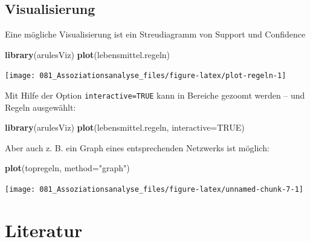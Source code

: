 \documentclass[12pt,]{book}
\newenvironment{Shaded}{\begin{snugshade}}{\end{snugshade}}
\newcommand{\KeywordTok}[1]{\textcolor[rgb]{0.13,0.29,0.53}{\textbf{{#1}}}}
\newcommand{\DataTypeTok}[1]{\textcolor[rgb]{0.13,0.29,0.53}{{#1}}}
\newcommand{\StringTok}[1]{\textcolor[rgb]{0.31,0.60,0.02}{{#1}}}
\newcommand{\OtherTok}[1]{\textcolor[rgb]{0.56,0.35,0.01}{{#1}}}
\newcommand{\NormalTok}[1]{{#1}}
\begin{document}
\subsection{Visualisierung}\label{visualisierung}

Eine mögliche Visualisierung ist ein Streudiagramm von Support und
Confidence

\begin{Shaded}
\begin{Highlighting}[]
\KeywordTok{library}\NormalTok{(arulesViz)}
\KeywordTok{plot}\NormalTok{(lebensmittel.regeln)}
\end{Highlighting}
\end{Shaded}

\begin{center}\texttt{[image: 081\_Assoziationsanalyse\_files/figure-latex/plot-regeln-1]} \end{center}

Mit Hilfe der Option \texttt{interactive=TRUE} kann in Bereiche gezoomt
werden -- und Regeln ausgewählt:

\begin{Shaded}
\begin{Highlighting}[]
\KeywordTok{library}\NormalTok{(arulesViz)}
\KeywordTok{plot}\NormalTok{(lebensmittel.regeln, }\DataTypeTok{interactive=}\OtherTok{TRUE}\NormalTok{)}
\end{Highlighting}
\end{Shaded}

Aber auch z. B. ein Graph eines entsprechenden Netzwerks ist möglich:

\begin{Shaded}
\begin{Highlighting}[]
\KeywordTok{plot}\NormalTok{(topregeln, }\DataTypeTok{method=}\StringTok{"graph"}\NormalTok{)}
\end{Highlighting}
\end{Shaded}

\begin{center}\texttt{[image: 081\_Assoziationsanalyse\_files/figure-latex/unnamed-chunk-7-1]} \end{center}

\section{Literatur}\label{literatur-2}
\end{document}

